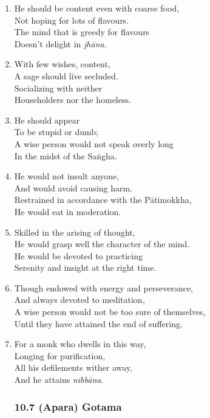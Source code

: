 \documentclass[10pt, openany]{book}
\begin{document}
\begin{enumerate}
\item He should be content even with coarse food,\\
Not hoping for lots of flavours.\\
The mind that is greedy for flavours\\
Doesn’t delight in \emph{jhāna}.

\item With few wishes, content,\\
A sage should live secluded.\\
Socializing with neither\\
Householders nor the homeless.

\item He should appear\\
To be stupid or dumb;\\
A wise person would not speak overly long\\
In the midst of the Saṅgha.

\item He would not insult anyone,\\
And would avoid causing harm.\\
Restrained in accordance with the Pātimokkha,\\
He would eat in moderation.

\item Skilled in the arising of thought,\\
He would grasp well the character of the mind.\\
He would be devoted to practicing\\
Serenity and insight at the right time.

\item Though endowed with energy and perseverance,\\
And always devoted to meditation,\\
A wise person would not be too sure of themselves,\\
Until they have attained the end of suffering.

\item For a monk who dwells in this way,\\
Longing for purification,\\
All his defilements wither away,\\
And he attains \emph{nibbāna}.

\subsubsection*{10.7 (Apara) Gotama}


\end{enumerate}
\end{document}
